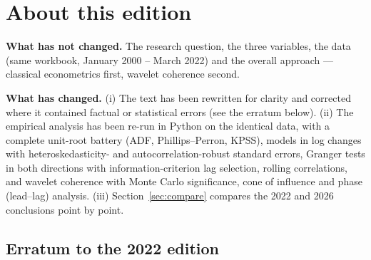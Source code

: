 \documentclass[11pt,a4paper]{article}
\begin{document}
\section*{About this edition}

\noindent\colorbox{edition}{\begin{minipage}{0.97\textwidth}\small
\vspace{4pt}
\textbf{What has not changed.} The research question, the three variables, the
data (same workbook, January 2000 -- March 2022) and the overall approach ---
classical econometrics first, wavelet coherence second.

\smallskip
\textbf{What has changed.}
(i) The text has been rewritten for clarity and corrected where it contained
factual or statistical errors (see the erratum below).
(ii) The empirical analysis has been re-run in Python on the identical data,
with a complete unit-root battery (ADF, Phillips--Perron, KPSS), models in log
changes with heteroskedasticity- and autocorrelation-robust standard errors,
Granger tests in both directions with information-criterion lag selection,
rolling correlations, and wavelet coherence with Monte Carlo significance,
cone of influence and phase (lead--lag) analysis.
(iii) Section~\ref{sec:compare} compares the 2022 and 2026 conclusions point by point.
\vspace{4pt}
\end{minipage}}

\subsection*{Erratum to the 2022 edition}
\end{document}
